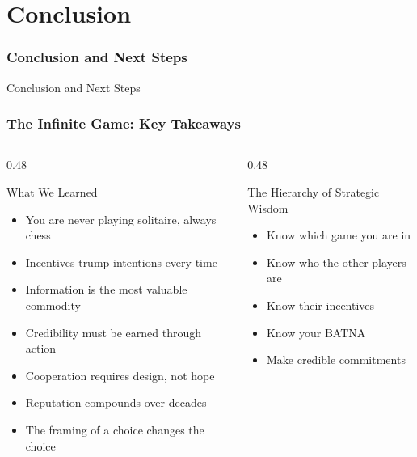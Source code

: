 \section{Conclusion}

\begin{frame}[fragile]\frametitle{Conclusion and Next Steps}
\begin{center}
{\Large Conclusion and Next Steps}
\end{center}
\end{frame}


\begin{frame}[fragile]\frametitle{The Infinite Game: Key Takeaways}
  \begin{columns}
    \begin{column}[T]{0.48\linewidth}
      \begin{block}{What We Learned}
        \begin{itemize}
          \item You are never playing solitaire, always chess
          \item Incentives trump intentions every time
          \item Information is the most valuable commodity
          \item Credibility must be earned through action
          \item Cooperation requires design, not hope
          \item Reputation compounds over decades
          \item The framing of a choice changes the choice
        \end{itemize}
      \end{block}
    \end{column}
    \begin{column}[T]{0.48\linewidth}
      \begin{block}{The Hierarchy of Strategic Wisdom}
        \begin{itemize}
          \item Know which game you are in
          \item Know who the other players are
          \item Know their incentives
          \item Know your BATNA
          \item Make credible commitments

\end{itemize}
\end{block}
\end{column}
\end{columns}
\end{frame}
